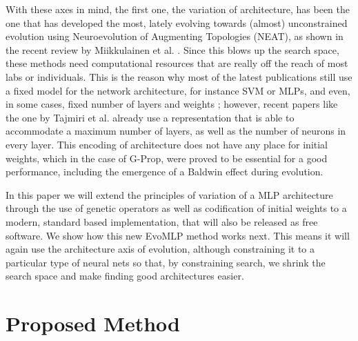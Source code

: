 \documentclass[conference]{IEEEtran}\usepackage[]{graphicx}\usepackage[]{color}
\begin{document}
With these axes in mind, the first one, the variation of architecture, has been the one that has developed the most,  lately evolving towards (almost)
unconstrained evolution using Neuroevolution of Augmenting Topologies (NEAT), as shown in the recent review by
Miikkulainen et al. \cite{miikkulainen2019evolving}. Since this blows
up the search space, these methods need computational resources that are
really off the reach of most labs or individuals. This is the reason why most of the latest publications 
still use a fixed model for the network architecture, for instance SVM
or MLPs, and even, in some cases, fixed number of layers and weights
\cite{ecer2020training}; however, recent papers like the one by
Tajmiri et al. \cite{TAJMIRI2020108997} already use a representation
that is able to accommodate a maximum number of layers, as well as the
number of neurons in every layer. This encoding of
architecture does not have any place for initial weights, which in the
case of G-Prop, were proved to be essential for a good performance,
including the emergence of a Baldwin effect \cite{castillo-2006}
during evolution.

In this paper we will extend the principles of variation of a MLP
architecture through the use of genetic operators as well as
codification of initial weights to a modern, standard based
implementation, that will also be released as free software. We show
how this new {\sf EvoMLP} method works next. This means it will again use the architecture axis of evolution, although constraining it to a particular type of neural nets so that, by constraining search, we shrink the search space and make finding good architectures easier.

\section{Proposed Method}
\label{method}


\end{document}
